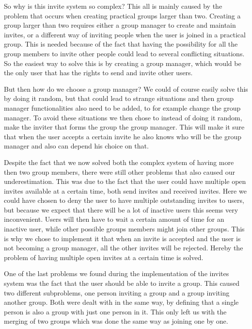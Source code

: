 So why is this invite system so complex?
This all is mainly caused by the problem that occurs when creating practical groups larger than two.
Creating a group larger than two requires either a group manager to create and maintain invites, or a different way of inviting people when the user is joined in a practical group.
This is needed because of the fact that having the possibility for all the group members to invite other people could lead to several conflicting situations.
So the easiest way to solve this is by creating a group manager, which would be the only user that has the rights to send and invite other users.

But then how do we choose a group manager?
We could of course easily solve this by doing it random, but that could lead to strange situations and then group manager functionalities also need to be added, to for example change the group manager.
To avoid these situations we then chose to instead of doing it random, make the inviter that forms the group the group manager.
This will make it sure that when the user accepts a certain invite he also knows who will be the group manager and also can depend his choice on that.

Despite the fact that we now solved both the complex system of having more then two group members, there were still other problems that also caused our underestimation.
This was due to the fact that the user could have multiple open invites available at a certain time, both send invites and received invites.
Here we could have chosen to deny the user to have multiple outstanding invites to users, but because we expect that there will be a lot of inactive users this seems very inconvenient.
Users will then have to wait a certain amount of time for an inactive user, while other possible groups members might join other groups.
This is why we chose to implement it that when an invite is accepted and the user is not becoming a group manager, all the other invites will be rejected.
Hereby the problem of having multiple open invites at a certain time is solved.

One of the last problems we found during the implementation of the invites system was the fact that the user should be able to invite a group.
This caused two different subproblems, one person inviting a group and a group inviting another group.
Both were dealt with in the same way, by defining that a single person is also a group with just one person in it.
This only left us with the merging of two groups which was done the same way as joining one by one.

